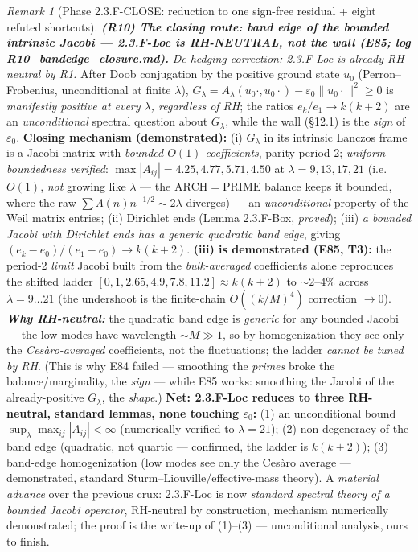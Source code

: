 \documentclass[11pt]{amsart}
\theoremstyle{definition}
\theoremstyle{remark}
\newtheorem{remark}[theorem]{Remark}
\newcommand{\ve}{\varepsilon}
\begin{document}
\begin{remark}[Phase 2.3.F-CLOSE: reduction to one sign-free residual + eight refuted shortcuts]
\smallskip
\emph{\textbf{(R10) The closing route: band edge of the bounded intrinsic Jacobi --- 2.3.F-Loc is RH-NEUTRAL, not the wall (E85; log R10\_bandedge\_closure.md).}} \emph{De-hedging correction: 2.3.F-Loc is already RH-neutral by R1.} After Doob conjugation by the positive ground state $u_0$ (Perron--Frobenius, unconditional at finite $\lambda$), $G_\lambda=A_\lambda(u_0\cdot,u_0\cdot)-\ve_0\|u_0\cdot\|^2\ge0$ is \emph{manifestly positive at every $\lambda$, regardless of RH}; the ratios $e_k/e_1\to k(k+2)$ are an \emph{unconditional} spectral question about $G_\lambda$, while the wall (\S12.1) is the \emph{sign} of $\ve_0$. \textbf{Closing mechanism (demonstrated):} (i) $G_\lambda$ in its intrinsic Lanczos frame is a Jacobi matrix with \emph{bounded $O(1)$ coefficients}, parity-period-2; \emph{uniform boundedness verified}: $\max|A_{ij}|=4.25,4.77,5.71,4.50$ at $\lambda=9,13,17,21$ (i.e.\ $O(1)$, \emph{not} growing like $\lambda$ --- the $\mathrm{ARCH}=\mathrm{PRIME}$ balance keeps it bounded, where the raw $\sum\Lambda(n)n^{-1/2}\sim2\lambda$ diverges) --- an \emph{unconditional} property of the Weil matrix entries; (ii) Dirichlet ends (Lemma 2.3.F-Box, \emph{proved}); (iii) \emph{a bounded Jacobi with Dirichlet ends has a generic quadratic band edge}, giving $(e_k-e_0)/(e_1-e_0)\to k(k+2)$. \textbf{(iii) is demonstrated (E85, T3):} the period-2 \emph{limit} Jacobi built from the \emph{bulk-averaged} coefficients alone reproduces the shifted ladder $[0,1,2.65,4.9,7.8,11.2]\approx k(k+2)$ to ${\sim}2$--$4\%$ across $\lambda=9\dots21$ (the undershoot is the finite-chain $O((k/M)^4)$ correction $\to0$). \emph{\textbf{Why RH-neutral:}} the quadratic band edge is \emph{generic} for any bounded Jacobi --- the low modes have wavelength ${\sim}M\gg1$, so by homogenization they see only the \emph{Ces\`aro-averaged} coefficients, not the fluctuations; the ladder \emph{cannot be tuned by RH}. (This is why E84 failed --- smoothing the \emph{primes} broke the balance/marginality, the \emph{sign} --- while E85 works: smoothing the Jacobi of the already-positive $G_\lambda$, the \emph{shape}.) \textbf{Net: 2.3.F-Loc reduces to three RH-neutral, standard lemmas, none touching $\ve_0$:} (1) an unconditional bound $\sup_\lambda\max_{ij}|A_{ij}|<\infty$ (numerically verified to $\lambda=21$); (2) non-degeneracy of the band edge (quadratic, not quartic --- confirmed, the ladder is $k(k+2)$); (3) band-edge homogenization (low modes see only the Ces\`aro average --- demonstrated, standard Sturm--Liouville/effective-mass theory). A \emph{material advance} over the previous crux: 2.3.F-Loc is now \emph{standard spectral theory of a bounded Jacobi operator}, RH-neutral by construction, mechanism numerically demonstrated; the proof is the write-up of (1)--(3) --- unconditional analysis, ours to finish.
\end{remark}
\end{document}
